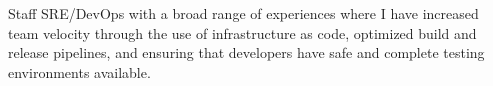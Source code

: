

\begin{cvparagraph}

Staff SRE/DevOps with a broad range of experiences where I have increased team velocity through the use of infrastructure as code, optimized build and release pipelines, and ensuring that developers have safe and complete testing environments available.
\end{cvparagraph}
